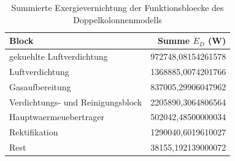 \begin{longtable}{lr}
\caption{Summierte Exergievernichtung der Funktionsbloecke des Doppelkolonnenmodells} \\
\hline
Block & Summe $\dot{E}_D$ (W) \\
\hline
gekuehlte Luftverdichtung & 972748,08154261578 \\
Luftverdichtung & 1368885,0074201766 \\
Gasaufbereitung & 837005,29906047962 \\
Verdichtungs- und Reinigungsblock & 2205890,3064806564 \\
Hauptwaermeuebertrager & 502042,48500000034 \\
Rektifikation & 1290040,6019610027 \\
Rest & 38155,192139000072 \\
\hline
\end{longtable}